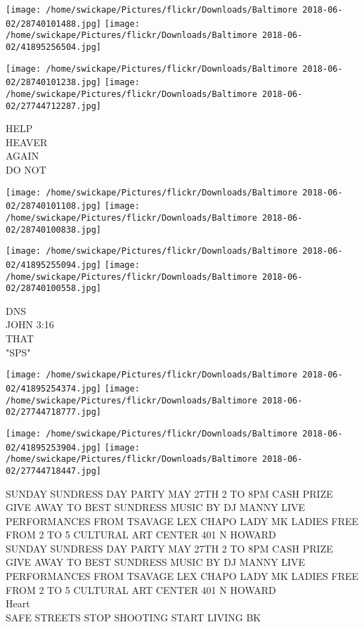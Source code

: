 \documentclass[10pt,letterpaper]{article}
\begin{document}
\texttt{[image: /home/swickape/Pictures/flickr/Downloads/Baltimore 2018-06-02/28740101488.jpg]}
\texttt{[image: /home/swickape/Pictures/flickr/Downloads/Baltimore 2018-06-02/41895256504.jpg]}

\texttt{[image: /home/swickape/Pictures/flickr/Downloads/Baltimore 2018-06-02/28740101238.jpg]}
\texttt{[image: /home/swickape/Pictures/flickr/Downloads/Baltimore 2018-06-02/27744712287.jpg]}

HELP\\
HEAVER\\
AGAIN\\
DO NOT\\
\pagebreak

\texttt{[image: /home/swickape/Pictures/flickr/Downloads/Baltimore 2018-06-02/28740101108.jpg]}
\texttt{[image: /home/swickape/Pictures/flickr/Downloads/Baltimore 2018-06-02/28740100838.jpg]}

\texttt{[image: /home/swickape/Pictures/flickr/Downloads/Baltimore 2018-06-02/41895255094.jpg]}
\texttt{[image: /home/swickape/Pictures/flickr/Downloads/Baltimore 2018-06-02/28740100558.jpg]}

DNS\\
JOHN 3:16\\
THAT\\
"SPS"\\
\pagebreak

\texttt{[image: /home/swickape/Pictures/flickr/Downloads/Baltimore 2018-06-02/41895254374.jpg]}
\texttt{[image: /home/swickape/Pictures/flickr/Downloads/Baltimore 2018-06-02/27744718777.jpg]}

\texttt{[image: /home/swickape/Pictures/flickr/Downloads/Baltimore 2018-06-02/41895253904.jpg]}
\texttt{[image: /home/swickape/Pictures/flickr/Downloads/Baltimore 2018-06-02/27744718447.jpg]}

SUNDAY SUNDRESS DAY PARTY MAY 27TH 2 TO 8PM CASH PRIZE GIVE AWAY TO BEST SUNDRESS MUSIC BY DJ MANNY LIVE PERFORMANCES FROM TSAVAGE LEX CHAPO LADY MK LADIES FREE FROM 2 TO 5 CULTURAL ART CENTER 401 N HOWARD\\
SUNDAY SUNDRESS DAY PARTY MAY 27TH 2 TO 8PM CASH PRIZE GIVE AWAY TO BEST SUNDRESS MUSIC BY DJ MANNY LIVE PERFORMANCES FROM TSAVAGE LEX CHAPO LADY MK LADIES FREE FROM 2 TO 5 CULTURAL ART CENTER 401 N HOWARD\\
Heart\\
SAFE STREETS STOP SHOOTING START LIVING BK\\
\pagebreak
\end{document}
